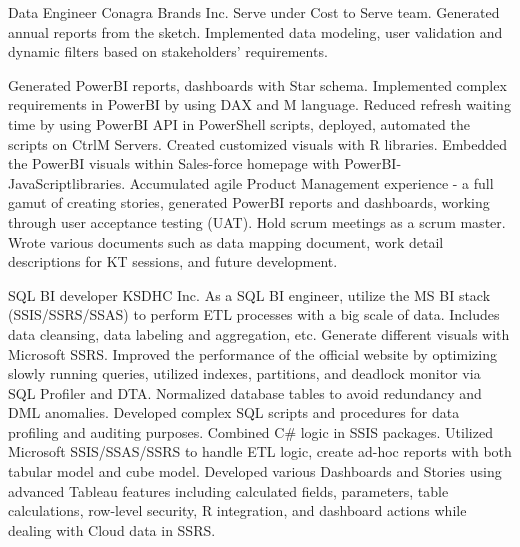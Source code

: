 \documentclass[a4paper]{ReadableCV}
\begin{document}
{Data Engineer}
{Conagra Brands Inc.}
{Serve under Cost to Serve team. Generated annual reports from the sketch.  Implemented data modeling, user validation and dynamic filters based on stakeholders' requirements.}

{Generated PowerBI reports, dashboards with Star schema. Implemented complex requirements in PowerBI by using DAX and M language.}
{Reduced refresh waiting time by using PowerBI API in PowerShell scripts, deployed, automated the scripts on CtrlM Servers.}
{Created customized visuals with R libraries. Embedded the PowerBI visuals within Sales-force homepage with PowerBI-JavaScriptlibraries.}
{Accumulated agile Product Management experience - a full gamut of creating stories, generated PowerBI reports and dashboards, working through user acceptance testing (UAT).}
{Hold scrum meetings as a scrum master. Wrote various documents such as data mapping document, work detail descriptions for KT sessions, and future development.}

{SQL BI developer}
{KSDHC Inc.}
{As a SQL BI engineer, utilize the MS BI stack (SSIS/SSRS/SSAS) to perform ETL processes with a big scale of data. Includes data cleansing, data labeling and aggregation, etc. Generate different visuals with Microsoft SSRS.}
{Improved the performance of the official website by optimizing slowly running queries, utilized indexes, partitions, and deadlock monitor via SQL Profiler and DTA.}
{Normalized database tables to avoid redundancy and DML anomalies.}
{Developed complex SQL scripts and procedures for data profiling and auditing purposes. Combined C\# logic in SSIS packages.}
{Utilized Microsoft SSIS/SSAS/SSRS to handle ETL logic, create ad-hoc reports with both tabular model and cube model.}
{Developed various Dashboards and Stories using advanced Tableau features including calculated fields, parameters, table
calculations, row-level security, R integration, and dashboard actions while dealing with Cloud data in SSRS.}


\end{document}
